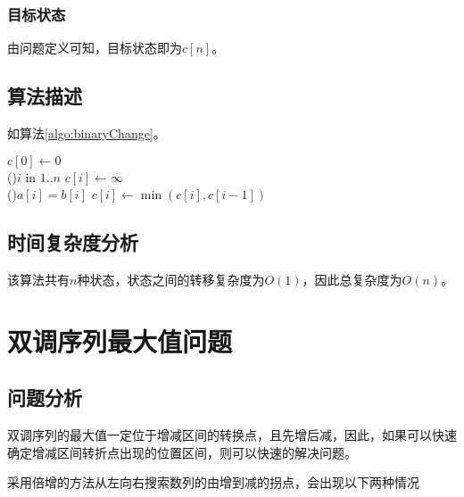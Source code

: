 \subsubsection{目标状态}

由问题定义可知，目标状态即为$c[n]$。

\subsection*{算法描述}
如算法\ref{algo:binaryChange}。

\begin{algorithm}[H]
    \caption{$binaryChange(a[1..n], b[1..n])$}\label{algo:binaryChange}
    $c[0] \leftarrow 0$\\

    \For(){$i$ in $1..n$}{
        $c[i] \leftarrow \infty$\\
        \If(){$a[i]=b[i]$}{
            $c[i] \leftarrow \min(c[i],c[i-1])$\\
        }
    }
    
\end{algorithm}

\subsection*{时间复杂度分析}
该算法共有$n$种状态，状态之间的转移复杂度为$O(1)$，因此总复杂度为$O(n)$。

\section{双调序列最大值问题}
\subsection*{问题分析}

双调序列的最大值一定位于增减区间的转换点，且先增后减，因此，如果可以快速确定增减区间转折点出现的位置区间，则可以快速的解决问题。

采用倍增的方法从左向右搜索数列的由增到减的拐点，会出现以下两种情况

